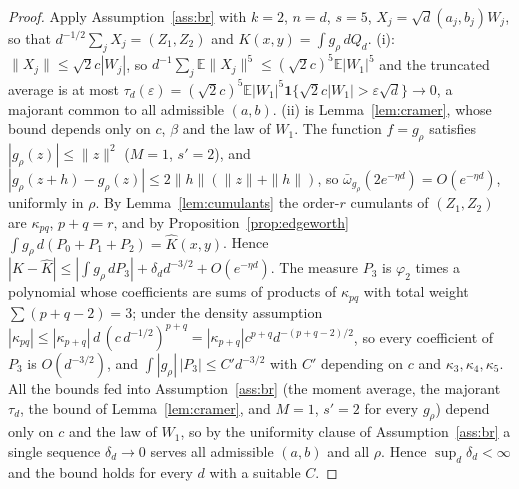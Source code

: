 \documentclass[11pt]{article}
\theoremstyle{definition}
\newcommand{\E}{\mathbb{E}}
\begin{document}
\begin{proof}
Apply Assumption~\ref{ass:br} with $k=2$, $n=d$, $s=5$, $X_j=\sqrt d(a_j,b_j)W_j$, so that
$d^{-1/2}\sum_jX_j=(Z_1,Z_2)$ and $K(x,y)=\int g_\rho\,dQ_d$.
(i): $\|X_j\|\le\sqrt2c|W_j|$, so $d^{-1}\sum_j\E\|X_j\|^5\le(\sqrt2c)^5\E|W_1|^5$ and
the truncated average is at most
$\tau_d(\varepsilon)=(\sqrt2c)^5\E|W_1|^5\mathbf 1\{\sqrt2c|W_1|>\varepsilon\sqrt d\}\to0$, a
majorant common to all admissible $(a,b)$. (ii) is Lemma~\ref{lem:cramer}, whose bound
depends only on $c$, $\beta$ and the law of $W_1$. The function
$f=g_\rho$ satisfies $|g_\rho(z)|\le\|z\|^2$ ($M=1$, $s'=2$), and
$|g_\rho(z+h)-g_\rho(z)|\le2\|h\|(\|z\|+\|h\|)$, so
$\bar\omega_{g_\rho}(2e^{-\eta d})=O(e^{-\eta d})$, uniformly in $\rho$. By
Lemma~\ref{lem:cumulants} the order-$r$ cumulants of $(Z_1,Z_2)$ are $\kappa_{pq}$,
$p+q=r$, and by Proposition~\ref{prop:edgeworth} $\int g_\rho\,d(P_0+P_1+P_2)=\widehat K(x,y)$.
Hence
$|K-\widehat K|\le|\int g_\rho\,dP_3|+\delta_dd^{-3/2}+O(e^{-\eta d})$. The measure $P_3$
is $\varphi_2$ times a polynomial whose coefficients are sums of products of
$\kappa_{pq}$ with total weight $\sum(p+q-2)=3$; under the density assumption
$|\kappa_{pq}|\le|\kappa_{p+q}|\,d\,(c\,d^{-1/2})^{p+q}=|\kappa_{p+q}|c^{p+q}d^{-(p+q-2)/2}$,
so every coefficient of $P_3$ is $O(d^{-3/2})$, and $\int|g_\rho|\,|P_3|\le C'd^{-3/2}$
with $C'$ depending on $c$ and $\kappa_3,\kappa_4,\kappa_5$. All the bounds fed into
Assumption~\ref{ass:br} (the moment average, the majorant $\tau_d$, the bound of
Lemma~\ref{lem:cramer}, and $M=1$, $s'=2$ for every $g_\rho$) depend only on $c$ and the
law of $W_1$, so by the uniformity clause of Assumption~\ref{ass:br} a single sequence
$\delta_d\to0$ serves all admissible $(a,b)$ and all $\rho$. Hence $\sup_d\delta_d<\infty$
and the bound holds for every $d$ with a suitable $C$.
\end{proof}
\end{document}
